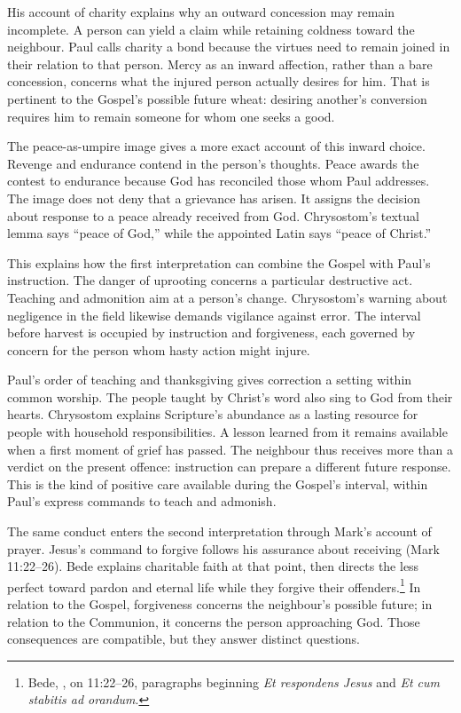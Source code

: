 His account of charity explains why an outward concession may remain
incomplete. A person can yield a claim while retaining coldness toward
the neighbour. Paul calls charity a bond because the virtues need
to remain joined in their relation to that person. Mercy as an inward
affection, rather than a bare concession, concerns what the injured
person actually desires for him. That is pertinent to the Gospel's
possible future wheat: desiring another's conversion requires him
to remain someone for whom one seeks a good.

The peace-as-umpire image gives a more exact account of this inward
choice. Revenge and endurance contend in the person's thoughts.
Peace awards the contest to endurance because God has reconciled
those whom Paul addresses. The image does not deny that a grievance
has arisen. It assigns the decision about response to a peace
already received from God. Chrysostom's textual lemma says ``peace
of God,'' while the appointed Latin says ``peace of Christ.''

This explains how the first interpretation can combine the Gospel
with Paul's instruction. The danger of uprooting concerns a particular
destructive act. Teaching and admonition aim at a person's change.
Chrysostom's warning about negligence in the field likewise demands
vigilance against error. The interval before harvest is occupied
by instruction and forgiveness, each governed by concern for the
person whom hasty action might injure.

Paul's order of teaching and thanksgiving gives correction a setting
within common worship. The people taught by Christ's word also sing
to God from their hearts. Chrysostom explains Scripture's abundance
as a lasting resource for people with household responsibilities.
A lesson learned from it remains available when a first moment of
grief has passed. The neighbour thus receives more than a verdict
on the present offence: instruction can prepare a different future
response. This is the kind of positive care available during the
Gospel's interval, within Paul's express commands to teach and admonish.

The same conduct enters the second interpretation through Mark's
account of prayer. Jesus's command to forgive follows his assurance
about receiving (Mark 11:22--26). Bede explains charitable faith at
that point, then directs the less perfect toward pardon and eternal
life while they forgive their offenders.\footnote{Bede, , on 11:22--26, paragraphs beginning \textit{Et respondens Jesus}
and \textit{Et cum stabitis ad orandum}.} In relation to the Gospel,
forgiveness concerns the neighbour's possible future; in relation
to the Communion, it concerns the person approaching God. Those
consequences are compatible, but they answer distinct questions.

